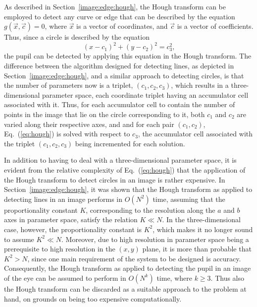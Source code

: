 As described in Section~\ref{image:edge:hough}, the Hough transform
can be employed to detect any curve or edge that can be described by
the equation $g(\vec{x},\vec{c})=0$, where $\vec{x}$ is a vector of
coordinates, and $\vec{c}$ is a vector of coefficients.  Thus, since a
circle is described by the equation
\begin{equation}
\label{eq:hough}
  (x-c_{1})^{2}+(y-c_{2})^{2}=c_{3}^{2}\mbox{,}
\end{equation}
the pupil can be detected by applying this equation in the Hough
transform.  The difference between the algorithm designed for
detecting lines, as depicted in Section~\ref{image:edge:hough}, and a
similar approach to detecting circles, is that the number of
parameters now is a triplet, $(c_{1},c_{2},c_{3})$, which results in a
three-dimensional parameter space, each coordinate triplet having an
accumulator cell associated with it.  Thus, for each accumulator cell
to contain the number of points in the image that lie on the circle
corresponding to it, both $c_{1}$ and $c_{2}$ are varied along their
respective axes, and and for each pair $(c_{1},c_{2})$,
Eq.~(\ref{eq:hough}) is solved with respect to $c_{3}$, the
accumulator cell associated with the triplet $(c_{1},c_{2},c_{3})$
being incremented for each solution.

In addition to having to deal with a three-dimensional parameter
space, it is evident from the relative complexity of
Eq.~(\ref{eq:hough}) that the application of the Hough transform to
detect circles in an image is rather expensive.  In
Section~\ref{image:edge:hough}, it was shown that the Hough transform
as applied to detecting lines in an image performs in $O(N^{2})$ time,
assuming that the proportionality constant $K$, corresponding to the
resolution along the $a$ and $b$ axes in parameter space, satisfy the
relation $K\ll N$.  In the three-dimensional case, however, the
proportionality constant is $K^{2}$, which makes it no longer sound to
assume $K^{2}\ll N$.  Moreover, due to high resolution in parameter
space being a prerequisite to high resolution in the $(x,y)$ plane, it
is more than probable that $K^{2}>N$, since one main requirement of
the system to be designed is accuracy.  Consequently, the Hough
transform as applied to detecting the pupil in an image of the eye can
be assumed to perform in $O(N^{k})$ time, where $k\geq 3$.  Thus also
the Hough transform can be discarded as a suitable approach to the
problem at hand, on grounds on being too expensive computationally.
